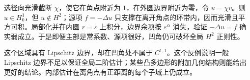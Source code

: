 \ProseParagraphBreak

选径向光滑截断 \(\chi\)，使它在角点附近为 \(1\)，在外圆边界附近为零，令 \(u=\chi v\)。则 \(u\in H_0^1\)，但 \(u\notin H^2\)；源项 \(f=-\Delta u\) 只支撑在离开角点的环带内，因而光滑且平方可积。局部化并在内圆 \(r=\varepsilon\) 上积分，边界余项按 \(\varepsilon^\alpha\) 消失，验证 \(-\Delta u=f\) 确实弱成立。于是即便主部是常系数、源项很好，凹角仍可破坏全局 \(H^2\) 正则性。

\ProseParagraphBreak

这个区域具有 Lipschitz 边界，却在凹角处不属于 \(C^{1,1}\)。这个反例说明一般 Lipschitz 边界不足以保证全局二阶估计；某些凸多边形的附加几何结构则能给出更好的结论。内部估计在离角点有正距离的每个子域上仍成立。
